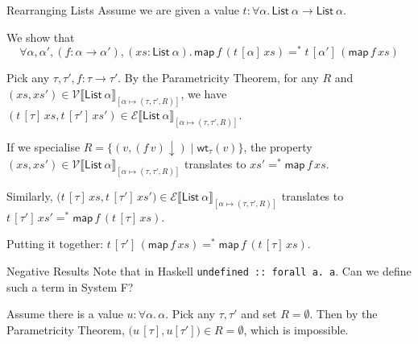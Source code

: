 \documentclass{beamer}
\newcommand{\denot}[1]{\llbracket#1\rrbracket}
\newcommand{\listt}[1]{\mathsf{List}~#1}
\newcommand{\map}{\mathsf{map}}
\newcommand{\haskell}[1]{\texttt{#1}}
\newcommand{\vint}[1]{\mathcal{V}\denot{#1}}
\newcommand{\tint}[1]{\mathcal{E}\denot{#1}}
\newcommand{\wt}[1]{\mathsf{wt}_{#1}}
\newcommand{\suc}{\mathsf{succ}}
\newcommand{\nf}[1]{#1{\downarrow}}
\newcommand{\eqnf}{=^*}
\begin{document}

\begin{frame}{Rearranging Lists}
Assume we are given a value
$t : \forall \alpha.\, \listt{\alpha}\to\listt{\alpha}$.

\pause
We show that
\begin{equation*}
  \forall \alpha,\alpha',(f : \alpha\to\alpha'),(xs : \listt{\alpha}).\, \map\,f\,(t\,[\alpha]\,xs)\eqnf t\,[\alpha']\,(\map\,f\,xs)
\end{equation*}

\pause
Pick any $\tau,\tau',f : \tau\to\tau'$.
\pause
By the Parametricity Theorem, for any $R$ and $(xs,xs')\in\vint{\listt{\alpha}}_{[\alpha\mapsto(\tau,\tau',R)]}$, we have $(t\,[\tau]\, xs,t\,[\tau']\, xs')\in\tint{\listt{\alpha}}_{[\alpha\mapsto(\tau,\tau',R)]}$.

\pause
If we specialise $R=\bigl\{(v,\nf{(f\, v)})\mid \wt{\tau}(v)\bigr\}$,
the property $(xs,xs')\in\vint{\listt{\alpha}}_{[\alpha\mapsto(\tau,\tau',R)]}$
translates to $xs'\eqnf \map\, f\, xs$.

\pause
Similarly,
$\bigl(t\,[\tau]\, xs,t\,[\tau']\, xs'\bigr)\in\tint{\listt{\alpha}}_{[\alpha\mapsto(\tau,\tau',R)]}$
translates to
$t\, [\tau']\,xs' \eqnf \map\,f\,(t\,[\tau]\, xs)$.

\pause
Putting it together: $t\, [\tau']\,(\map\, f\, xs) \eqnf \map\,f\,(t\,[\tau]\, xs)$.
\end{frame}

\begin{frame}{Negative Results}
Note that in Haskell \haskell{undefined :: forall a. a}.
Can we define such a term in System F?

\pause
Assume there is a value $u : \forall \alpha.\, \alpha$.
Pick any $\tau,\tau'$ and set $R=\emptyset$.
\pause
Then by the Parametricity Theorem,
$\bigl(u\,[\tau],u[\tau']\bigr)\in R=\emptyset$,
which is impossible.

\end{frame}
\end{document}
